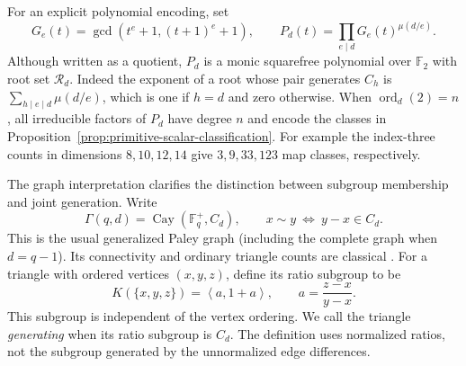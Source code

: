\documentclass[11pt]{article}
\begin{document}
For an explicit polynomial encoding, set
\[
 G_e(t)=\gcd(t^e+1,(t+1)^e+1),\qquad
 P_d(t)=\prod_{e\mid d}G_e(t)^{\mu(d/e)}.
\]
Although written as a quotient, $P_d$ is a monic squarefree polynomial
over $\mathbb F_2$ with root set $\mathcal R_d$. Indeed the exponent
of a root whose pair generates $C_h$ is
$\sum_{h\mid e\mid d}\mu(d/e)$, which is one if $h=d$ and zero otherwise.
When $\operatorname{ord}_d(2)=n$, all irreducible factors of $P_d$
have degree $n$ and encode the classes in
Proposition~\ref{prop:primitive-scalar-classification}.
For example the index-three counts in dimensions $8,10,12,14$ give
$3,9,33,123$ map classes, respectively.

The graph interpretation clarifies the distinction between subgroup
membership and joint generation. Write
\[
 \Gamma(q,d)=\operatorname{Cay}(\mathbb F_q^+,C_d),
 \qquad x\sim y\ \Longleftrightarrow\ y-x\in C_d.
\]
This is the usual generalized Paley graph (including the complete
graph when $d=q-1$). Its connectivity and ordinary triangle counts
are classical \cite{LP09,DaMc21}. For a triangle with ordered vertices
$(x,y,z)$, define its ratio subgroup to be
\[
 K(\{x,y,z\})=\left\langle a,1+a\right\rangle,
 \qquad a=\frac{z-x}{y-x}.
\]
This subgroup is independent of the vertex ordering. We call the
triangle \emph{generating} when its ratio subgroup is $C_d$.
The definition uses normalized ratios, not the subgroup generated
by the unnormalized edge differences.
\end{document}
